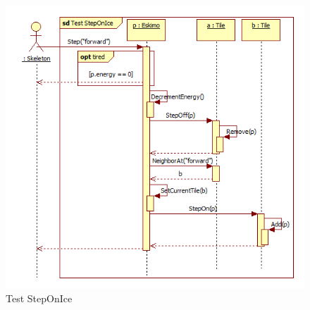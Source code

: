 \begin{figure}[H]
	\begin{center}
		\includegraphics[width=13cm]{chapters/chapter05/diagrams/Test_StepOnIce.png}
		\caption{Test StepOnIce}
		\label{fig:Test StepOnIce}
	\end{center}
\end{figure}

